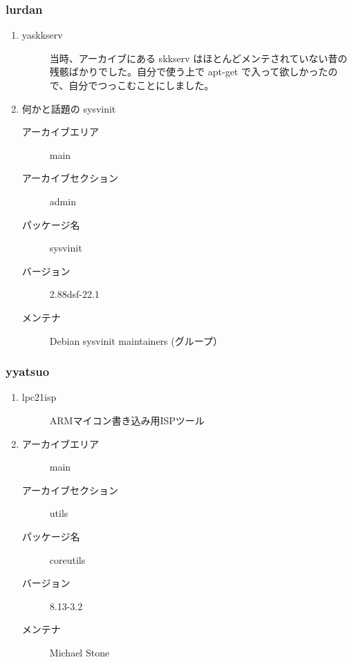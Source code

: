 \documentclass[cjk,dvipdfmx,10pt,%
hyperref={bookmarks=true,bookmarksnumbered=true,bookmarksopen=false,%
colorlinks=false,%
pdftitle={第 59 回 関西 Debian 勉強会},%
pdfauthor={倉敷・のがた・かわだ・佐々木},%
pdfsubject={資料},%
}]{beamer}
\begin{document}
\begin{frame}
  \frametitle{ lurdan }
  \begin{enumerate}
  \item
    \begin{description}
    \item [yaskkserv] 当時、アーカイブにある skkserv はほとんどメンテされていない昔の残骸ばかりでした。自分で使う上で apt-get で入って欲しかったので、自分でつっこむことにしました。
    \end{description}
  \item 何かと話題の sysvinit
    \begin{description}
    \item [アーカイブエリア] main
    \item [アーカイブセクション] admin
    \item [パッケージ名] sysvinit
    \item [バージョン] 2.88dsf-22.1
    \item [メンテナ] Debian sysvinit maintainers (グループ）
    \end{description}
  \end{enumerate}
\end{frame}

\begin{frame}
  \frametitle{ yyatsuo }
  \begin{enumerate}
  \item
    \begin{description}
    \item [lpc21isp] ARMマイコン書き込み用ISPツール
    \end{description}
  \item 
    \begin{description}
    \item [アーカイブエリア] main
    \item [アーカイブセクション] utils
    \item [パッケージ名] coreutils
    \item [バージョン] 8.13-3.2
    \item [メンテナ]  Michael Stone 
    \end{description}
  \end{enumerate}
\end{frame}
\end{document}

